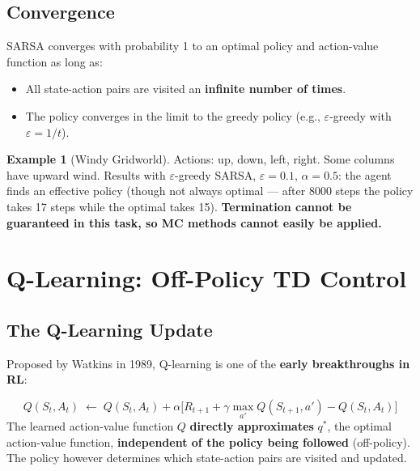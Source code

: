 \documentclass[11pt,a4paper]{article}
\theoremstyle{definition}
\newtheorem{example}{Example}[section]
\theoremstyle{plain}
\theoremstyle{remark}
\begin{document}
\subsection{Convergence}

SARSA converges with probability 1 to an optimal policy and action-value function as long as:
\begin{itemize}
    \item All state-action pairs are visited an \textbf{infinite number of times}.
    \item The policy converges in the limit to the greedy policy (e.g., $\varepsilon$-greedy with $\varepsilon = 1/t$).
\end{itemize}

\begin{example}[Windy Gridworld]
Actions: up, down, left, right. Some columns have upward wind. Results with $\varepsilon$-greedy SARSA, $\varepsilon = 0.1$, $\alpha = 0.5$: the agent finds an effective policy (though not always optimal — after 8000 steps the policy takes 17 steps while the optimal takes 15). \textbf{Termination cannot be guaranteed in this task, so MC methods cannot easily be applied.}
\end{example}

\section{Q-Learning: Off-Policy TD Control}

\subsection{The Q-Learning Update}

Proposed by Watkins in 1989, Q-learning is one of the \textbf{early breakthroughs in RL}:

\begin{tcolorbox}[colback=green!5!white, colframe=green!60!black, title={Q-Learning Update Rule}]
\[
    Q(S_t, A_t) \;\leftarrow\; Q(S_t, A_t) + \alpha\bigl[R_{t+1} + \gamma \max_{a'} Q(S_{t+1}, a') - Q(S_t, A_t)\bigr]
\]
The learned action-value function $Q$ \textbf{directly approximates} $q^*$, the optimal action-value function, \textbf{independent of the policy being followed} (off-policy). The policy however determines which state-action pairs are visited and updated.
\end{tcolorbox}
\end{document}
